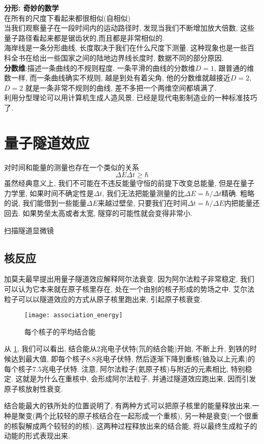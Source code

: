 \documentclass{article}
\begin{document}
\textbf{分形: 奇妙的数学}\\
在所有的尺度下看起来都很相似(自相似)\\
当我们观察量子在一段时间内的运动路径时, 发现当我们不断增加放大倍数, 这些量子路径看起来都是锯齿状的,而且都是非常相似的.\\
海岸线是一条分形曲线, 长度取决于我们在什么尺度下测量. 这种现象也是一些百科全书在给出一些国家之间的陆地边界线长度时, 数据不同的部分原因.\\
\textbf{分数维}:描述一条曲线的不规则程度. 一条平滑的曲线的分数维$D=1$, 跟普通的维数一样, 而一条曲线确实不规则, 越是到处有着尖角, 他的分数维就越接近$D=2$, $D=2$ 就是一条非常不规则的曲线, 差不多把一个两维空间都填满了.\\
利用分型理论可以用计算机生成人造风景, 已经是现代电影制造业的一种标准技巧了.

\section{量子隧道效应}
对时间和能量的测量也存在一个类似的关系
$$
\Delta E \Delta t \geq \hbar
$$
虽然经典意义上, 我们不可能在不违反能量守恒的前提下改变总能量, 但是在量子力学里, 如果时间不确定性是$\Delta t$, 我们无法把能量测量的比$\Delta E = \hbar /\Delta t$精确.
粗略的说, 我们能借到一些能量$\Delta E$来越过壁垒, 只要我们在时间$\Delta t = \hbar / \Delta E$内把能量还回去. 如果势垒太高或者太宽, 隧穿的可能性就会变得非常小.

扫描隧道显微镜

\subsection{核反应}
加莫夫最早提出用量子隧道效应解释阿尔法衰变. 因为阿尔法粒子非常稳定, 我们可以认为它本来就在原子核里存在, 处在一个由别的核子形成的势场之中.
艾尔法粒子可以以隧道效应的方式从原子核里跑出来, 引起原子核衰变.

\begin{figure}[htbp]
		\centering
		\texttt{[image: association\_energy]}
		\caption{每个核子的平均结合能}
		\label{fig.nuclear.association}
\end{figure}
从
\ref{fig.nuclear.association},
我们可以看出, 结合能从2兆电子伏特(氘的结合能)开始, 不断上升, 到铁的时候达到最大值, 即每个核子$8.8$兆电子伏特,
然后逐渐下降到重核(铀及以上元素)的每个核子$7.5$兆电子伏特.
注意, 阿尔法粒子(氦原子核)与附近的元素相比, 特别稳定. 这就是为什么在重核中, 会形成阿尔法粒子, 并通过隧道效应跑出来, 因而引发原子核放射性衰变.

结合能最大的铁所处的位置说明了, 有两种方式可以把原子核里的能量释放出来.一种是聚变(两个比较轻的原子核结合在一起形成一个重核), 另一种是衰变(一个很重的核裂解成两个较轻的的核).
这两种过程释放出来的结合能, 将以最终生成粒子的动能的形式表现出来.
\end{document}
